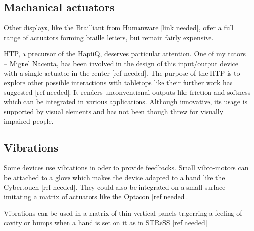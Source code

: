 \subsection{Machanical actuators}\label{machanical-actuators}


Other displays, like the Brailliant from Humanware {[}link needed{]},
offer a full range of actuators forming braille letters, but remain
fairly expensive.

HTP, a precursor of the HaptiQ, deserves particular attention. One of my
tutors -- Miguel Nacenta, has been involved in the design of this
input/output device with a single actuator in the center {[}ref
needed{]}. The purpose of the HTP is to explore other possible
interactions with tabletops like their further work has suggested {[}ref
needed{]}. It renders unconventional outputs like friction and softness
which can be integrated in various applications. Although innovative,
its usage is supported by visual elements and has not been though threw
for visually impaired people.

\subsection{Vibrations}\label{vibrations}

Some devices use vibrations in oder to provide feedbacks. Small
vibro-motors can be attached to a glove which makes the device adapted
to a hand like the Cybertouch {[}ref needed{]}. They could also be
integrated on a small surface imitating a matrix of actuators like the
Optacon {[}ref needed{]}.

Vibrations can be used in a matrix of thin vertical panels trigerring a
feeling of cavity or bumps when a hand is set on it as in STReSS {[}ref
needed{]}.

